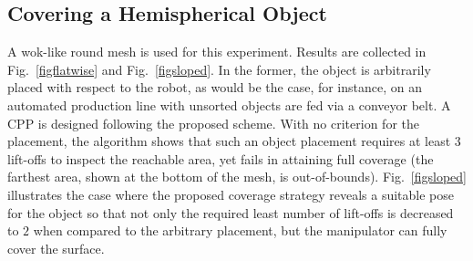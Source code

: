 \documentclass[journal]{IEEEtran}
\begin{document}
\subsection{Covering a Hemispherical Object}
A wok-like round mesh is used for this experiment. Results are collected in Fig.~\ref{figflatwise} and Fig.~\ref{figsloped}. 
In the former, the object is arbitrarily placed with respect to the robot, as would be the case, for instance, on an automated production line with unsorted objects are fed via a conveyor belt. A CPP is designed following the proposed scheme. With no criterion for the placement, the algorithm shows that such an object placement requires at least $3$ lift-offs to inspect the reachable area, yet fails in attaining full coverage (the farthest area, shown at the bottom of the mesh, is out-of-bounds).
Fig.~\ref{figsloped} illustrates the case where the proposed coverage strategy reveals a suitable pose for the object so that not only the required least number of lift-offs is decreased to $2$ when compared to the arbitrary placement, 
but the manipulator can fully cover the surface.
\end{document}
